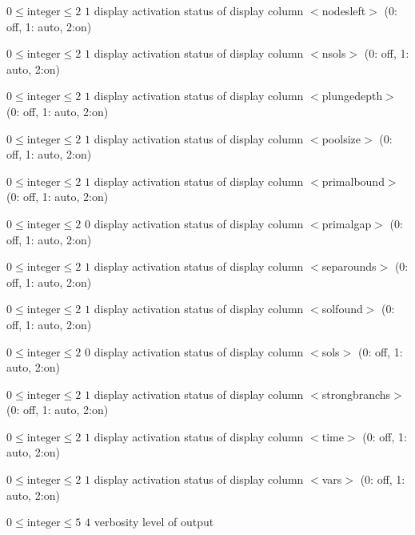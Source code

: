 %
{$0\leq\textrm{integer}\leq2$}%
{$1$}%
{display activation status of display column $<$nodesleft$>$ (0: off, 1: auto, 2:on)}%
{}

%
{$0\leq\textrm{integer}\leq2$}%
{$1$}%
{display activation status of display column $<$nsols$>$ (0: off, 1: auto, 2:on)}%
{}

%
{$0\leq\textrm{integer}\leq2$}%
{$1$}%
{display activation status of display column $<$plungedepth$>$ (0: off, 1: auto, 2:on)}%
{}

%
{$0\leq\textrm{integer}\leq2$}%
{$1$}%
{display activation status of display column $<$poolsize$>$ (0: off, 1: auto, 2:on)}%
{}

%
{$0\leq\textrm{integer}\leq2$}%
{$1$}%
{display activation status of display column $<$primalbound$>$ (0: off, 1: auto, 2:on)}%
{}

%
{$0\leq\textrm{integer}\leq2$}%
{$0$}%
{display activation status of display column $<$primalgap$>$ (0: off, 1: auto, 2:on)}%
{}

%
{$0\leq\textrm{integer}\leq2$}%
{$1$}%
{display activation status of display column $<$separounds$>$ (0: off, 1: auto, 2:on)}%
{}

%
{$0\leq\textrm{integer}\leq2$}%
{$1$}%
{display activation status of display column $<$solfound$>$ (0: off, 1: auto, 2:on)}%
{}

%
{$0\leq\textrm{integer}\leq2$}%
{$0$}%
{display activation status of display column $<$sols$>$ (0: off, 1: auto, 2:on)}%
{}

%
{$0\leq\textrm{integer}\leq2$}%
{$1$}%
{display activation status of display column $<$strongbranchs$>$ (0: off, 1: auto, 2:on)}%
{}

%
{$0\leq\textrm{integer}\leq2$}%
{$1$}%
{display activation status of display column $<$time$>$ (0: off, 1: auto, 2:on)}%
{}

%
{$0\leq\textrm{integer}\leq2$}%
{$1$}%
{display activation status of display column $<$vars$>$ (0: off, 1: auto, 2:on)}%
{}

%
{$0\leq\textrm{integer}\leq5$}%
{$4$}%
{verbosity level of output}%
{}

